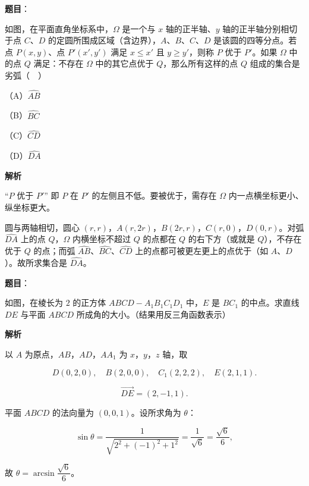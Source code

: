 \begin{answer}

\textbf{题目}：

如图，在平面直角坐标系中，$\Omega$ 是一个与 $x$ 轴的正半轴、$y$ 轴的正半轴分别相切于点 $C$、$D$ 的定圆所围成区域（含边界），$A$、$B$、$C$、$D$ 是该圆的四等分点。若点 $P(x,y)$、点 $P'(x',y')$ 满足 $x\leqslant x'$ 且 $y\geqslant y'$，则称 $P$ 优于 $P'$。如果 $\Omega$ 中的点 $Q$ 满足：不存在 $\Omega$ 中的其它点优于 $Q$，那么所有这样的点 $Q$ 组成的集合是劣弧（　）
\nopagebreak[4]
\begin{center}\end{center}
\nopagebreak[4]
（A）$\widehat{AB}$

（B）$\widehat{BC}$

（C）$\widehat{CD}$

（D）$\widehat{DA}$

\textbf{解析}

“$P$ 优于 $P'$” 即 $P$ 在 $P'$ 的左侧且不低。要被优于，需存在 $\Omega$ 内一点横坐标更小、纵坐标更大。

圆与两轴相切，圆心 $(r,r)$，$A(r,2r)$，$B(2r,r)$，$C(r,0)$，$D(0,r)$。对弧 $\widehat{DA}$ 上的点 $Q$，$\Omega$ 内横坐标不超过 $Q$ 的点都在 $Q$ 的右下方（或就是 $Q$），不存在优于 $Q$ 的点；而弧 $\widehat{AB}$、$\widehat{BC}$、$\widehat{CD}$ 上的点都可被更左更上的点优于（如 $A$、$D$）。故所求集合是 $\widehat{DA}$。


\end{answer}
\begin{answer}

\textbf{题目}：

如图，在棱长为 $2$ 的正方体 $ABCD-A_1B_1C_1D_1$ 中，$E$ 是 $BC_1$ 的中点。求直线 $DE$ 与平面 $ABCD$ 所成角的大小。（结果用反三角函数表示）
\nopagebreak[4]
\begin{center}\end{center}
\nopagebreak[4]
\textbf{解析}

以 $A$ 为原点，$AB$，$AD$，$AA_1$ 为 $x$，$y$，$z$ 轴，取

\nopagebreak[4]
\[D(0,2,0),\quad B(2,0,0),\quad C_1(2,2,2),\quad E(2,1,1).\]

\nopagebreak[4]
\[\overrightarrow{DE}=(2,-1,1).\]

平面 $ABCD$ 的法向量为 $(0,0,1)$。设所求角为 $\theta$：

\nopagebreak[4]
\[\sin\theta=\frac{1}{\sqrt{2^2+(-1)^2+1^2}}=\frac1{\sqrt6}=\frac{\sqrt6}6,\]

故 $\theta=\arcsin\dfrac{\sqrt6}6$。


\end{answer}
